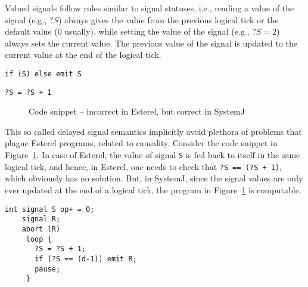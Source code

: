 \documentclass[10pt,journal,cspaper,compsoc]{IEEEtran}
\begin{document}
Valued signals follow rules similar to signal statuses, i.e., reading a
value of the signal (e.g., $?S$) always gives the value from the
previous logical tick or the default value (0 usually), while setting
the value of the signal (e.g., $?S = 2$) always sets the current
value. The previous value of the signal is updated to the current value
at the end of the logical tick.

\newbox{\causalf}
\begin{lrbox}{\causalf}
  \begin{lstlisting}[style=sysj,morekeywords={signal,loop,abort,await,emit,present,trap,pause,exit,delay,suspend}]
    if (S) else emit S
  \end{lstlisting}
\end{lrbox}

\newbox{\causals}
\begin{lrbox}{\causals}
  \begin{lstlisting}[style=sysj,morekeywords={signal,loop,abort,await,emit,present,trap,pause,exit,delay,suspend}]
    ?S = ?S + 1
  \end{lstlisting}
\end{lrbox}

\begin{figure}[t!]
  \centering
\usebox\causals
\caption{Code snippet -- incorrect in Esterel, but correct in
      SystemJ}
  \label{fig:11}
\end{figure}

This so called delayed signal semantics implicitly avoid plethora of
problems that plague Esterel programs, related to causality. 
Consider the code snippet in Figure~\ref{fig:11}. In case of Esterel,
the value of signal \texttt{S} is fed back to itself in the same logical
tick, and hence, in Esterel, one needs to check that \mbox{\texttt{?S ==
    (?S + 1)}}, which obviously has no solution. But, in SystemJ, since
the signal values are only ever updated at the end of a logical tick,
the program in Figure~\ref{fig:11} is computable.

\newbox{\flisting}
\begin{lrbox}{\flisting}
  \begin{lstlisting}[style=sysj,morekeywords={signal,loop,abort,await,emit,present,trap,pause,exit,delay,suspend}]
    int signal S op+ = 0;
    signal R;
    abort (R) 
     loop {
       ?S = ?S + 1;
       if (?S == (d-1)) emit R;
       pause;
     }
  \end{lstlisting}
\end{lrbox}
\end{document}
